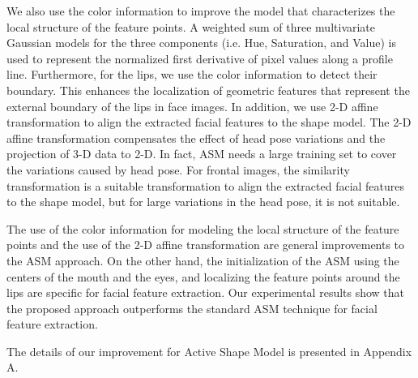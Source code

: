 We also use the color information to improve the model that
characterizes the local structure of the feature points. A weighted
sum of three multivariate Gaussian models for the three components
(i.e. Hue, Saturation, and Value) is used to represent the
normalized first derivative of pixel values along a profile line.
Furthermore, for the lips, we use the color information to detect
their boundary. This enhances the localization of geometric features
that represent the external boundary of the lips in face images. In
addition, we use 2-D affine transformation to align the extracted
facial features to the shape model. The 2-D affine transformation
compensates the effect of head pose variations and the projection of
3-D data to 2-D. In fact, ASM needs a large training set to cover
the variations caused by head pose. For frontal images, the
similarity transformation is a suitable transformation to align the
extracted facial features to the shape model, but for large
variations in the head pose, it is not suitable.

The use of the color information for modeling the local structure of
the feature points and the use of the 2-D affine transformation are
general improvements to the ASM approach. On the other hand, the
initialization of the ASM using the centers of the mouth and the
eyes, and localizing the feature points around the lips are specific
for facial feature extraction. Our experimental results show that
the proposed approach outperforms the standard ASM technique for
facial feature extraction.

The details of our improvement for Active Shape Model is presented
in Appendix A.

